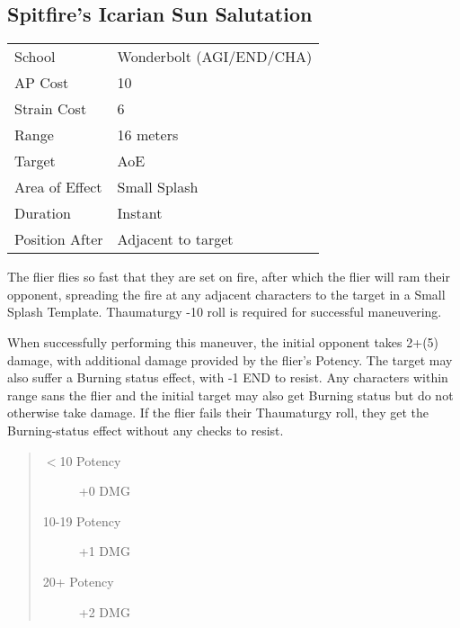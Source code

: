 \documentclass[11pt,a4paper,twocolumn]{book}
\begin{document}
\subsection*{Spitfire's Icarian Sun Salutation}
{
	\begin{tabu} to 75mm{| X[l,4] | X[l,7] |}
		\hline
		School 			& Wonderbolt (AGI/END/CHA)		\\
		AP Cost	      	& 10 		\\
		Strain Cost     & 6 				\\
		Range     		& 16 meters 				\\
		Target      	& AoE 				\\
		Area of Effect  & Small Splash 	 	\\
		Duration     	& Instant 	 		\\
		Position After  & Adjacent to target 	\\ \hline
	\end{tabu}
	
}

\medskip

The flier flies so fast that they are set on fire, after which the flier will ram their opponent, spreading the fire at any adjacent characters to the target in a Small Splash Template. Thaumaturgy -10 roll is required for successful maneuvering.

When successfully performing this maneuver, the initial opponent takes 2+(5) damage, with additional damage provided by the flier's Potency. The target may also suffer a Burning status effect, with -1 END to resist. Any characters within range sans the flier and the initial target may also get Burning status but do not otherwise take damage. If the flier fails their Thaumaturgy roll, they get the Burning-status effect without any checks to resist.

\begin{quote}
	\begin{description}
		\item[$<$10 Potency] 	+0 DMG
		\item[10-19 Potency] 	+1 DMG
		\item[20+ Potency] 	    +2 DMG
	\end{description}
\end{quote}

\vfill
\end{document}
